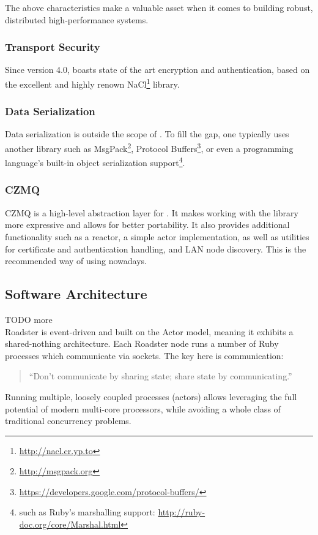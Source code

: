 The above characteristics make \zmq a valuable asset when it comes to building
robust, distributed high-performance systems.

\subsubsection{Transport Security}
Since version 4.0, \zmq boasts state of the art encryption and authentication,
based on the excellent and highly renown
NaCl\footnote{\url{http://nacl.cr.yp.to}} library.

\subsubsection{Data Serialization}
Data serialization is outside the scope of \zmq. To fill the gap, one typically
uses another library such as MsgPack\footnote{\url{http://msgpack.org}},
Protocol
Buffers\footnote{\url{https://developers.google.com/protocol-buffers/}}, or
even a programming language's built-in object serialization
support\footnote{such as Ruby's marshalling support:
\url{http://ruby-doc.org/core/Marshal.html}}.

\subsubsection{CZMQ}
CZMQ is a high-level abstraction layer for \zmq. It makes working with the \zmq
library more expressive and allows for better portability. It also provides
additional functionality such as a reactor, a simple actor implementation, as
well as utilities for certificate and authentication handling, and LAN node
discovery. This is the recommended way of using \zmq nowadays.

\subsection{Software Architecture}
TODO more\\

Roadster is event-driven and built on the Actor model, meaning it exhibits a
shared-nothing architecture. Each Roadster node runs a number of Ruby processes
which communicate via \zmq sockets. The key here is communication:

\begin{quote}
``Don't communicate by sharing state; share state by communicating.''
\end{quote}

Running multiple, loosely coupled processes (actors) allows leveraging the full
potential of modern multi-core processors, while avoiding a whole class of
traditional concurrency problems.


